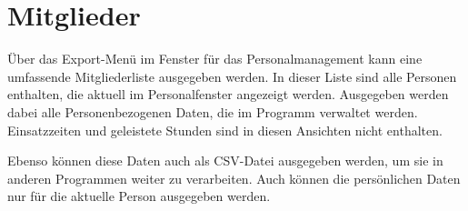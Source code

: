 \section{Mitglieder}
Über das Export-Menü im Fenster für das Personalmanagement kann eine umfassende Mitgliederliste ausgegeben werden.
In dieser Liste sind alle Personen enthalten, die aktuell im Personalfenster angezeigt werden.
Ausgegeben werden dabei alle Personenbezogenen Daten, die im Programm verwaltet werden.
Einsatzzeiten und geleistete Stunden sind in diesen Ansichten nicht enthalten.

Ebenso können diese Daten auch als CSV-Datei ausgegeben werden, um sie in anderen Programmen weiter zu verarbeiten.
Auch können die persönlichen Daten nur für die aktuelle Person ausgegeben werden.
